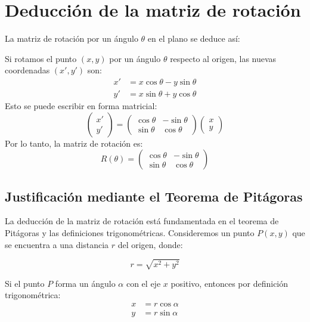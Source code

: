 \section{Deducción de la matriz de rotación}\label{sec:rotacion}
La matriz de rotación por un ángulo $\theta$ en el plano se deduce así:

Si rotamos el punto $(x, y)$ por un ángulo $\theta$ respecto al origen, las nuevas coordenadas $(x', y')$ son:
\begin{align}
x' &= x \cos \theta - y \sin \theta \label{eq:rotacion_x}\\
y' &= x \sin \theta + y \cos \theta \label{eq:rotacion_y}
\end{align}
Esto se puede escribir en forma matricial:
\begin{equation*}
\begin{pmatrix}
x' \\
y'
\end{pmatrix} =
\begin{pmatrix}
\cos \theta & -\sin \theta \\
\sin \theta & \cos \theta
\end{pmatrix}
\begin{pmatrix}
x \\
y
\end{pmatrix}
\end{equation*}
Por lo tanto, la matriz de rotación es:
\begin{equation}\label{eq:matriz_rotacion}
R(\theta) = \begin{pmatrix}
\cos \theta & -\sin \theta \\
\sin \theta & \cos \theta
\end{pmatrix}
\end{equation}

\subsection{Justificación mediante el Teorema de Pitágoras}

La deducción de la matriz de rotación está fundamentada en el teorema de Pitágoras y las definiciones trigonométricas. Consideremos un punto $P(x, y)$ que se encuentra a una distancia $r$ del origen, donde:

\begin{equation}\label{eq:distancia_origen}
r = \sqrt{x^2 + y^2}
\end{equation}

Si el punto $P$ forma un ángulo $\alpha$ con el eje $x$ positivo, entonces por definición trigonométrica:
\begin{align*}
x &= r \cos \alpha \\
y &= r \sin \alpha
\end{align*}


